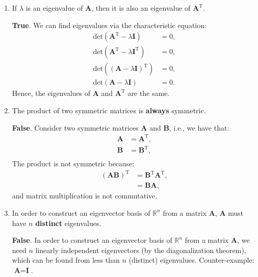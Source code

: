 \documentclass{exam}
\begin{document}
\begin{enumerate}
    \item If $\lambda$ is an eigenvalue of $\textbf{A}$, then it is also an eigenvalue of $\textbf{A}^\text{T}$.
	
	\begin{solutionorbox}[2in] \textbf{True}.
		We can find eigenvalues via the characteristic equation:
			\begin{align*}
				\text{det}(\textbf{A}^\text{T} - \lambda \textbf{I}) &= 0, \\
				\text{det}(\textbf{A}^\text{T} - \lambda \textbf{I}^\text{T}) &= 0, \\
				\text{det}((\textbf{A} - \lambda \textbf{I})^\text{T}) &= 0, \\
				\text{det}(\textbf{A} - \lambda \textbf{I}) &= 0. 
			\end{align*}
		Hence, the eigenvalues of $\textbf{A}$ and $\textbf{A}^\text{T}$ are the same.
	\end{solutionorbox}

    \item The product of two symmetric matrices is \textbf{always} symmetric.
	
	\begin{solutionorbox}[2in] \textbf{False}.
		Consider two symmetric matrices $\textbf{A}$ and $\textbf{B}$, i.e., we have that:
		\begin{align*}
			\textbf{A} &= \textbf{A}^\text{T}, \\
			\textbf{B} &= \textbf{B}^\text{T}, \\
		\end{align*}
		The product is not symmetric because:
		\begin{align*}
			\left(\textbf{A}\textbf{B}\right)^\text{T} &= \textbf{B}^\text{T}\textbf{A}^\text{T}, \\
			&= \textbf{B}\textbf{A},
		\end{align*}
		and matrix multiplication is not commutative.
	\end{solutionorbox}

    \item In order to construct an eigenvector basis of $\mathbb{R}^n$ from a matrix $\textbf{A}$, $\textbf{A}$ must have $n$ \textbf{distinct} eigenvalues.
	
	\begin{solutionorbox}[3.2in] \textbf{False}.
		In order to construct an eigenvector basis of $\mathbb{R}^n$ from a matrix $\textbf{A}$, we need $n$ linearly independent eigenvectors (by the diagonalization theorem), which can be found from less than $n$ (distinct) eigenvalues.
		Counter-example: $\textbf{A} = \textbf{I}$.
	\end{solutionorbox}


\end{enumerate}
\end{document}
